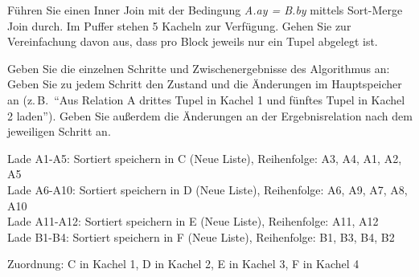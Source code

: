Führen Sie einen Inner Join mit der Bedingung \emph{A.ay = B.by} mittels Sort-Merge Join durch. Im Puffer stehen 5 Kacheln zur Verfügung. Gehen Sie zur Vereinfachung davon aus, dass pro Block jeweils nur ein Tupel abgelegt ist.

Geben Sie die einzelnen Schritte und Zwischenergebnisse des Algorithmus an: Geben Sie zu jedem Schritt den Zustand und die Änderungen im Hauptspeicher an (z.\,B.\ "`Aus Relation A drittes Tupel in Kachel 1 und fünftes Tupel in Kachel 2 laden"'). Geben Sie außerdem die Änderungen an der Ergebnisrelation nach dem jeweiligen Schritt an.

\begin{solution}
	Lade A1-A5: Sortiert speichern in C (Neue Liste), Reihenfolge: A3, A4, A1, A2, A5\\
	Lade A6-A10: Sortiert speichern in D (Neue Liste), Reihenfolge: A6, A9, A7, A8, A10\\
	Lade A11-A12: Sortiert speichern in E (Neue Liste), Reihenfolge: A11, A12\\
	Lade B1-B4: Sortiert speichern in F (Neue Liste), Reihenfolge: B1, B3, B4, B2

	Zuordnung: C in Kachel 1, D in Kachel 2, E in Kachel 3, F in Kachel 4


\end{solution}
